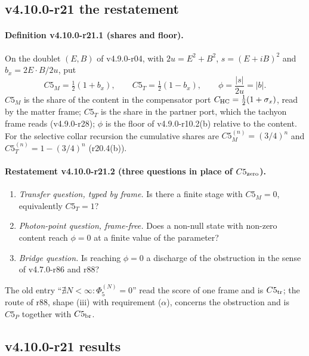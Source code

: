 \subsection*{v4.10.0-r21 the restatement}
\label{subsec:v4100-r21-restatement}

\paragraph{Definition v4.10.0-r21.1 (shares and floor).}
On the doublet \((E,B)\) of v4.9.0-r04, with \(2u=E^2+B^2\), \(s=(E+iB)^2\) and \(b_x=2E\cdot B/2u\), put
\[
C5_M=\tfrac12(1+b_x),\qquad C5_T=\tfrac12(1-b_x),\qquad \phi=\frac{|s|}{2u}=|b| .
\]
\(C5_M\) is the share of the content in the compensator port \(C_{\rm HC}=\tfrac12(1+\sigma_x)\), read by the matter frame; \(C5_T\) is the
share in the partner port, which the tachyon frame reads (v4.9.0-r28); \(\phi\) is the floor of v4.9.0-r10.2(b) relative to the content.
For the selective collar recursion the cumulative shares are \(C5_M^{(n)}=(3/4)^n\) and \(C5_T^{(n)}=1-(3/4)^n\) (r20.4(b)).

\paragraph{Restatement v4.10.0-r21.2 (three questions in place of \(C5_{\rm zero}\)).}
\begin{enumerate}[leftmargin=2em]
\item[\(C5_{\rm tr}\)] \emph{Transfer question, typed by frame.}  Is there a finite stage with \(C5_M=0\), equivalently \(C5_T=1\)?
\item[\(C5_P\)] \emph{Photon-point question, frame-free.}  Does a non-null state with non-zero content reach \(\phi=0\) at a finite value of the
parameter?
\item[\(C5_{\rm br}\)] \emph{Bridge question.}  Is reaching \(\phi=0\) a discharge of the obstruction in the sense of v4.7.0-r86 and r88?
\end{enumerate}
The old entry ``\(\nexists N<\infty:\Phi_5^{(N)}=0\)'' read the score of one frame and is \(C5_{\rm tr}\); the route of r88, shape (iii) with
requirement (\(\alpha\)), concerns the obstruction and is \(C5_P\) together with \(C5_{\rm br}\).

\subsection*{v4.10.0-r21 results}
\label{subsec:v4100-r21-results}

